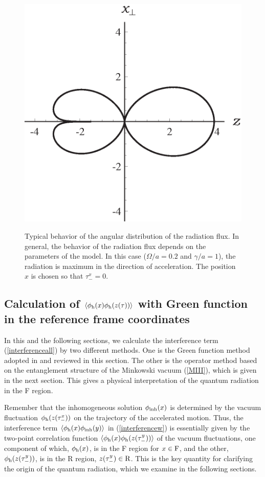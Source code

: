 \documentclass[aps,prd,preprintnumbers,nofootinbib,showpacs]{revtex4}%
\begin{document}
\begin{widetext}
\begin{figure}[t]
\begin{center}
~~~~~~~~~~~~~~~~~
    \includegraphics[width=5.cm]{fig7.eps}
\caption{Typical behavior of the angular distribution of the radiation flux. In general, the behavior 
of the radiation flux depends on the parameters of the model. In this case ($\Omega/a=0.2$ and $\gamma/a=1$), 
the radiation is maximum in the direction of acceleration. The position $x$ is chosen so that $\tau_-^x = 0$. 
\label{fig:funF}}
\end{center}
\end{figure}





\subsection{Calculation of $\langle\phi_{\rm h}(x)\phi_{\rm h}(z(\tau))\rangle$ with 
Green function in the reference frame coordinates 
\label{Sec:InterferenceMink}}
In this and the following sections, we calculate the 
interference term (\ref{interferenceall}) by two different methods.
One is the Green function method adopted in \cite{IYZ,IYZ2013} and reviewed in this section.
The other is the operator method based on the entanglement structure of the 
Minkowski vacuum (\ref{MIII}), which is given in the next section. This gives a physical interpretation
of the quantum radiation in the F region.

Remember that the inhomogeneous solution $\phi_{\rm inh}(x)$ is 
determined by the vacuum fluctuation $\phi_{\rm h}(z(\tau_-^x))$
on the trajectory of the accelerated motion. 
Thus, the interference term $\langle \phi_{\rm h}(x) \phi_{\rm inh}(y)\rangle$ in (\ref{interferencew})
is essentially given by the two-point correlation function  
$\langle \phi_{\rm h}(x) \phi_{\rm h}(z(\tau_-^y))\rangle$
of the vacuum fluctuations, 
one component of which, $\phi_{\rm h}(x)$, is in the F region for $x \in {\rm F}$, and the other, $\phi_{\rm h}(z(\tau_-^y))$,
is in the R region, $z(\tau_-^y) \in {\rm R}$. 
This is the key quantity for clarifying the origin of the quantum radiation, which we examine in the 
following sections.


\end{widetext}
\end{document}
